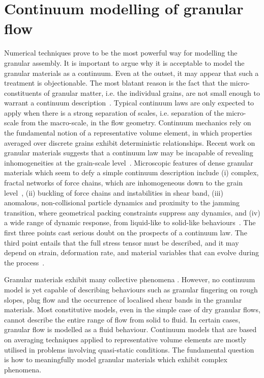 \section{Continuum modelling of granular flow}

Numerical techniques prove to be the most powerful way for modelling the 
granular assembly. It is important to argue why it is acceptable to model the 
granular materials as a continuum. Even at the outset, it may appear that 
such a treatment is objectionable. The most blatant reason is the fact 
that the micro-constituents of granular matter, i.e. the individual grains, are 
not small enough to warrant a continuum description~\citep{Kamrin2007}. Typical 
continuum laws are only expected to apply when there is a strong separation of 
scales, i.e. separation of the micro-scale from the macro-scale, in the flow 
geometry. Continuum mechanics rely on the fundamental notion of a 
representative volume element, in which properties averaged over discrete 
grains exhibit deterministic relationships. Recent work on granular 
materials suggests that a continuum law may be incapable of revealing 
inhomogeneities at the grain-scale level~\citep{Rycroft2009b}. Microscopic 
features of dense granular materials which seem to defy a simple continuum
description include (i) complex, fractal networks of force chains, which 
are inhomogeneous down to the grain level~\citep{Goldhirsch2003}, (ii) buckling 
of force chains and instabilities in shear band, (iii) anomalous, 
non-collisional particle dynamics and proximity to the jamming 
transition, where geometrical packing constraints suppress any dynamics, and 
(iv) a wide range of dynamic response, from liquid-like to solid-like 
behaviours~\citep{Jaeger1996,Aranson2001,Aranson2002}. The first three
points cast serious doubt on the prospects of a continuum law. The third point 
entails that the full stress tensor must be described, and it may depend on 
strain, deformation rate, and material variables that can evolve during the 
process~\citep{Rycroft2009b}.

Granular materials exhibit many collective phenomena \citep{Jaeger1996}. 
However, no continuum model is yet capable of describing behaviours such as 
granular fingering on rough slopes, plug flow and the 
occurrence of localised shear bands in the granular materials. Most 
constitutive models, even in the simple case 
of dry granular flows, cannot describe the entire range of flow from solid to 
fluid. In certain cases, granular flow is modelled as a fluid behaviour. 
Continuum models that are based on averaging techniques applied to
representative volume elements are mostly utilised in problems involving 
quasi-static conditions. The fundamental question is how to meaningfully model 
granular materials which exhibit complex phenomena. 


